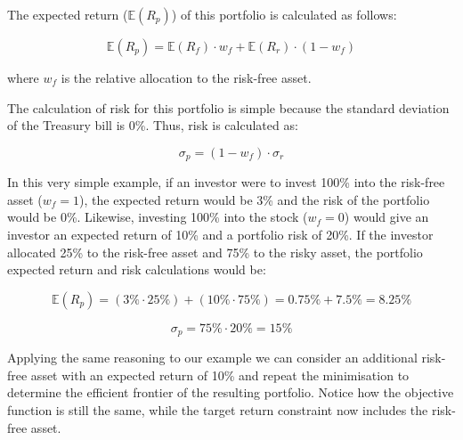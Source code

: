 The expected return (\(\mathbb{E}(R_p)\)) of this portfolio is calculated as
follows:

\[ \mathbb{E}(R_p) = \mathbb{E}(R_f)\cdot w_f + \mathbb{E}(R_r)\cdot (1- w_f) \]

where \(w_f\) is the relative allocation to the risk-free asset.

The calculation of risk for this portfolio is simple because the
standard deviation of the Treasury bill is 0\%. Thus, risk is calculated
as:

\[ \sigma_p = (1-w_f)\cdot \sigma_r \]

In this very simple example, if an investor were to invest 100\% into
the risk-free asset (\(w_f=1\)), the expected return would be 3\% and
the risk of the portfolio would be 0\%. Likewise, investing 100\% into
the stock (\(w_f=0\)) would give an investor an expected return of 10\%
and a portfolio risk of 20\%. If the investor allocated 25\% to the
risk-free asset and 75\% to the risky asset, the portfolio expected
return and risk calculations would be:

\[ \mathbb{E}(R_p) = (3\% \cdot 25\%) + (10\% \cdot 75\%) = 0.75\% + 7.5\% = 8.25\% \]

\[ \sigma_p = 75\% \cdot 20\% = 15\% \]

Applying the same reasoning to our example we can consider an additional
risk-free asset with an expected return of 10\% and repeat the
minimisation to determine the efficient frontier of the resulting
portfolio. Notice how the objective function is still the same, while
the target return constraint now includes the risk-free asset.

